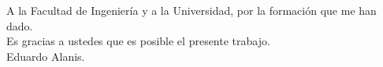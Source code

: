 \begin{dedication}
A la Facultad de Ingeniería y a la  Universidad, por la formación que me han dado.\\
Es gracias a ustedes que es posible el presente trabajo.\\

Eduardo Alanis.
\end{dedication}
